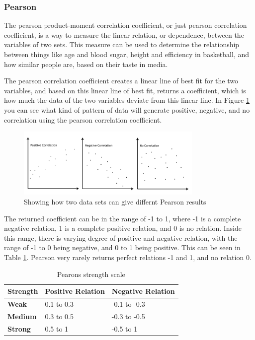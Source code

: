 \subsubsection{Pearson}

The pearson product-moment correlation coefficient, or just pearson correlation coefficient, is a way to measure the linear relation, or dependence, between the variables of two sets. This measure can be used to determine the relationship between things like age and blood sugar, height and efficiency in basketball, and how similar people are, based on their taste in media. \cite{Pearson2}

The pearson correlation coefficient creates a linear line of best fit for the two variables, and based on this linear line of best fit, returns a coefficient, which is how much the data of the two variables deviate from this linear line. In Figure \ref{Pearson2} you can see what kind of pattern of data will generate positive, negative, and no correlation using the pearson correlation coefficient. \cite{Pearson2}

\begin{figure}[htb]
\centering
\includegraphics[width=0.8\textwidth]{Images/pearson2.png}
\caption{Showing how two data sets can give differnt Pearson results}
\label{Pearson2}
\end{figure}

The returned coefficient can be in the range of -1 to 1, where -1 is a complete negative relation, 1 is a complete positive relation, and 0 is no relation. Inside this range, there is varying degree of positive and negative relation, with the range of -1 to 0 being negative, and 0 to 1 being positive. This can be seen in Table \ref{PearsonStr}. Pearson very rarely returns perfect relations -1 and 1, and no relation 0. \cite{Pearson2}

\begin{table}[htb]
\centering
\begin{tabular}{|l|l|l|} \hline
	\textbf{Strength} & \textbf{Positive Relation} & \textbf{Negative Relation} \\ \hline
	\textbf{Weak} & 0.1 to 0.3 & -0.1 to -0.3 \\ \hline
	\textbf{Medium} & 0.3 to 0.5 & -0.3 to -0.5 \\ \hline
	\textbf{Strong} & 0.5 to 1 & -0.5 to 1 \\ \hline
\end{tabular}
\caption{Pearons strength scale}
\label{PearsonStr}
\end{table}

